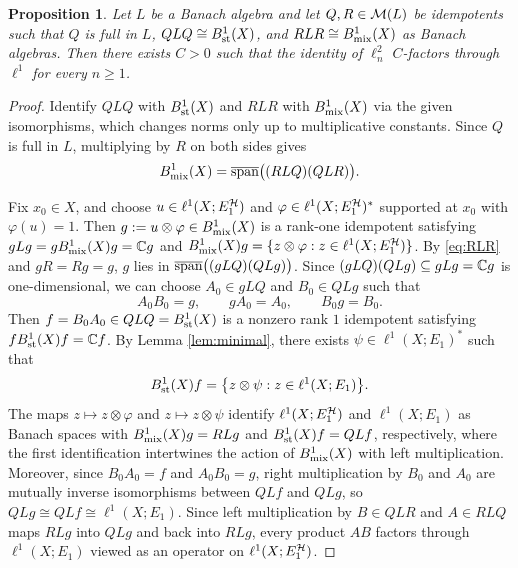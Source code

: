 \documentclass[11pt,reqno]{amsart}
\theoremstyle{definition}
\theoremstyle{plain}
\newtheorem{Pro}[Def]{Proposition}
\def\ox{\otimes}
\begin{document}
\begin{Pro}\label{pro:full_factor}
Let $L$ be a Banach algebra and let $Q,R\in\mathcal M(L)$ be idempotents such that $Q$ is full in $L$, $QLQ\cong B^1_{\textup{st}}(X)$, and $RLR\cong B^1_{\textup{mix}}(X)$ as Banach algebras. Then there exists $C>0$ such that the identity of $\ell^2_n$ $C$-factors through $\ell^1$ for every $n\ge1$.
\end{Pro}

\begin{proof}
Identify $QLQ$ with $B^1_{\textup{st}}(X)$ and $RLR$ with $B^1_{\textup{mix}}(X)$ via the given isomorphisms, which changes norms only up to multiplicative constants. Since $Q$ is full in $L$, multiplying by $R$ on both sides gives
\begin{equation}\label{eq:RLR}
B^1_{\textup{mix}}(X)=\overline{\textup{span}}\big((RLQ)(QLR)\big).
\end{equation}

Fix $x_0\in X$, and choose $u\in\ell^1(X;E_1^{\mathcal H})$ and $\varphi\in\ell^1(X;E_1^{\mathcal H})^*$ supported at $x_0$ with $\varphi(u)=1$. Then $g:=u\ox\varphi\in B^1_{\textup{mix}}(X)$ is a rank-one idempotent satisfying $gLg=gB^1_{\textup{mix}}(X)g=\mathbb C g$ and $B^1_{\textup{mix}}(X)g=\{z\ox\varphi:z\in\ell^1(X;E_1^{\H})\}$. By \eqref{eq:RLR} and $gR=Rg=g$, $g$ lies in $\overline{\textup{span}}\big((gLQ)(QLg)\big)$. Since $(gLQ)(QLg)\subseteq gLg=\mathbb C g$ is one-dimensional, we can choose $A_0\in gLQ$ and $B_0\in QLg$ such that
\[
A_0B_0=g,\qquad gA_0=A_0,\qquad B_0g=B_0.
\]
Then $f=B_0A_0\in QLQ=B^1_{\textup{st}}(X)$ is a nonzero rank $1$ idempotent satisfying $fB^1_{\textup{st}}(X)f=\mathbb C f$. By Lemma \ref{lem:minimal}, there exists $\psi\in\ell^1(X;E_1)^*$ such that
\[
B^1_{\textup{st}}(X)f=\big\{z\ox\psi:z\in\ell^1(X;E_1)\big\}.
\]
The maps $z\mapsto z\ox\varphi$ and $z\mapsto z\ox\psi$ identify $\ell^1(X;E_1^{\mathcal H})$ and $\ell^1(X;E_1)$ as Banach spaces with $B^1_{\textup{mix}}(X)g=RLg$ and $B^1_{\textup{st}}(X)f=QLf$, respectively, where the first identification intertwines the action of $B^1_{\textup{mix}}(X)$ with left multiplication. Moreover, since $B_0A_0=f$ and $A_0B_0=g$, right multiplication by $B_0$ and $A_0$ are mutually inverse isomorphisms between $QLf$ and $QLg$, so $QLg\cong QLf\cong \ell^1(X;E_1)$. Since left multiplication by $B\in QLR$ and $A\in RLQ$ maps $RLg$ into $QLg$ and back into $RLg$, every product $AB$ factors through $\ell^1(X;E_1)$ viewed as an operator on $\ell^1(X;E_1^{\mathcal H})$.


\end{proof}
\end{document}
